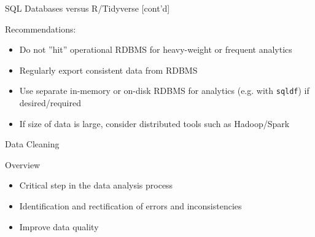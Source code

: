 \documentclass[ignorenonframetext,xcolor=x11names]{beamer}
\begin{document}
\begin{frame}{SQL Databases versus R/Tidyverse \small [cont'd]}
\begin{block}{Recommendations:}
  \begin{itemize}
     \item Do not ''hit'' operational RDBMS for heavy-weight or frequent analytics
     \item Regularly export consistent data from RDBMS
     \item Use separate in-memory or on-disk RDBMS for analytics (e.g. with \texttt{sqldf}) if desired/required
     \item If size of data is large, consider distributed tools such as Hadoop/Spark
  \end{itemize}
\end{block}
\end{frame}



\begin{frame}{Data Cleaning}

\begin{block}{Overview}
\begin{itemize}
  \item Critical step in the data analysis process
  \item Identification and rectification of errors and inconsistencies
  \item Improve data quality
\end{itemize}
\end{block}
\end{frame}
\end{document}
